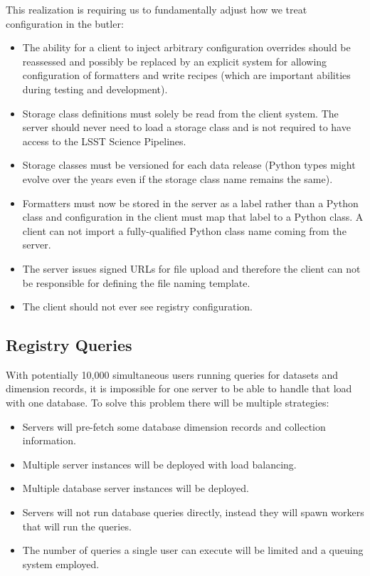 This realization is requiring us to fundamentally adjust how we treat configuration in the butler:

\begin{itemize}
\item The ability for a client to inject arbitrary configuration overrides should be reassessed and possibly be replaced by an explicit system for allowing configuration of formatters and write recipes (which are important abilities during testing and development).
\item Storage class definitions must solely be read from the client system.
  The server should never need to load a storage class and is not required to have access to the LSST Science Pipelines.
\item Storage classes must be versioned for each data release (Python types might evolve over the years even if the storage class name remains the same).
\item Formatters must now be stored in the server as a label rather than a Python class and configuration in the client must map that label to a Python class.
  A client can not import a fully-qualified Python class name coming from the server.
\item The server issues signed URLs for file upload and therefore the client can not be responsible for defining the file naming template.
\item The client should not ever see registry configuration.
\end{itemize}

\subsection{Registry Queries}

With potentially 10,000 simultaneous users running queries for datasets and dimension records, it is impossible for one server to be able to handle that load with one database.
To solve this problem there will be multiple strategies:

\begin{itemize}
\item
  Servers will pre-fetch some database dimension records and collection information. \cite{DMTN-289}
\item
  Multiple server instances will be deployed with load balancing.
\item
  Multiple database server instances will be deployed.
\item
  Servers will not run database queries directly, instead they will spawn workers that will run the queries.
\item
  The number of queries a single user can execute will be limited and a queuing system employed.
\end{itemize}


